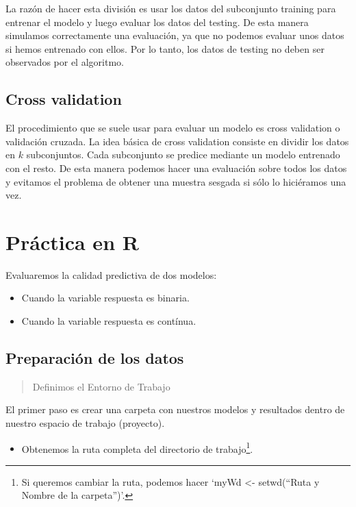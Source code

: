 \documentclass[]{book}
\providecommand{\tightlist}{%
  \setlength{\itemsep}{0pt}\setlength{\parskip}{0pt}}
\let\rmarkdownfootnote\footnote%
\def\footnote{\protect\rmarkdownfootnote}
\begin{document}
La razón de hacer esta división es usar los datos del subconjunto training para entrenar el modelo y luego evaluar los datos del testing. De esta manera simulamos correctamente una evaluación, ya que no podemos evaluar unos datos si hemos entrenado con ellos. Por lo tanto, los datos de testing no deben ser observados por el algoritmo.

\hypertarget{cross-validation}{%
\subsection{Cross validation}\label{cross-validation}}

El procedimiento que se suele usar para evaluar un modelo es cross validation o validación cruzada. La idea básica de cross validation consiste en dividir los datos en \(k\) subconjuntos. Cada subconjunto se predice mediante un modelo entrenado con el resto. De esta manera podemos hacer una evaluación sobre todos los datos y evitamos el problema de obtener una muestra sesgada si sólo lo hiciéramos una vez.

\hypertarget{practica-en-r}{%
\section{Práctica en R}\label{practica-en-r}}

Evaluaremos la calidad predictiva de dos modelos:

\begin{itemize}
\tightlist
\item
  Cuando la variable respuesta es binaria.
\item
  Cuando la variable respuesta es contínua.
\end{itemize}

\hypertarget{preparacion-de-los-datos}{%
\subsection{Preparación de los datos}\label{preparacion-de-los-datos}}

\begin{quote}
Definimos el Entorno de Trabajo
\end{quote}

El primer paso es crear una carpeta con nuestros modelos y resultados dentro de nuestro espacio de trabajo (proyecto).

\begin{itemize}
\tightlist
\item
  Obtenemos la ruta completa del directorio de trabajo\footnote{Si queremos cambiar la ruta, podemos hacer `myWd \textless{}- setwd(``Ruta y Nombre de la carpeta'')'.}.
\end{itemize}
\end{document}
